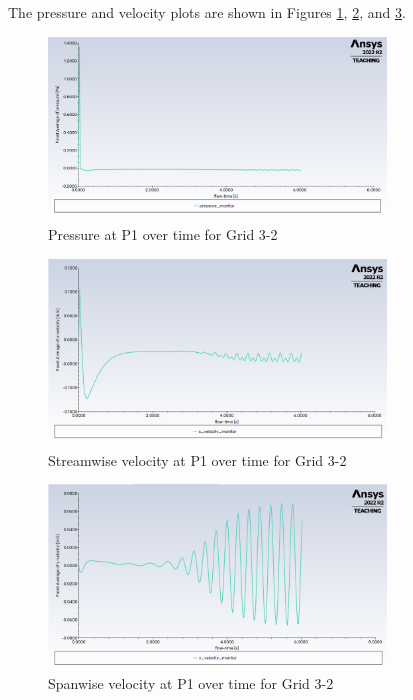 The pressure and velocity plots are shown in Figures \ref{fig:pressure plot grid 3 2}, \ref{fig:x-velocity plot grid 3 2}, and \ref{fig:y-velocity plot grid 3 2}.
\begin{figure}[H]
    \centering
    \includegraphics[width=0.8\textwidth]{Questions/Figures/pressure plot grid 3 2.png}
    \caption{Pressure at P1 over time for Grid 3-2}
    \label{fig:pressure plot grid 3 2}
\end{figure}
\begin{figure}[H]
    \centering
    \includegraphics[width=0.8\textwidth]{Questions/Figures/x-velocity plot grid 3 2.png}
    \caption{Streamwise velocity at P1 over time for Grid 3-2}
    \label{fig:x-velocity plot grid 3 2}
\end{figure}
\begin{figure}[H]
    \centering
    \includegraphics[width=0.8\textwidth]{Questions/Figures/y-velocity plot grid 3 2.png}
    \caption{Spanwise velocity at P1 over time for Grid 3-2}
    \label{fig:y-velocity plot grid 3 2}
\end{figure}

